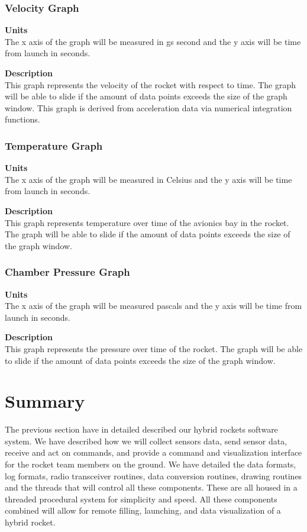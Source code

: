 \documentclass[10pt,draftclsnofoot,onecolumn,compsoc]{IEEEtran}
\begin{document}
\subsubsection{Velocity Graph}
{\bf Units} \\ The x axis of the graph will be measured in gs second and the y axis will be time from launch in seconds.\par
{\bf Description} \\ This graph represents the velocity of the rocket with respect to time. The graph will be able to slide if the amount of data points exceeds the size of the graph window. This graph is derived from acceleration data via numerical integration functions. \par

\subsubsection{Temperature Graph}
{\bf Units} \\ The x axis of the graph will be measured in Celsius and the y axis will be time from launch in seconds.\par
{\bf Description} \\ This graph represents temperature over time of the avionics bay in the rocket. The graph will be able to slide if the amount of data points exceeds the size of the graph window. \par

\subsubsection{Chamber Pressure Graph}
{\bf Units} \\ The x axis of the graph will be measured pascals and the y axis will be time from launch in seconds.\par
{\bf Description} \\ This graph represents the pressure over time of the rocket. The graph will be able to slide if the amount of data points exceeds the size of the graph window. \par


\section{Summary}
The previous section have in detailed described our hybrid rockets software system. We have described how we will collect sensors data, send sensor data, receive and act on commands, and provide  a command and visualization interface for the rocket team members on the ground. We have detailed the data formats, log formats, radio transceiver routines, data conversion routines, drawing routines and the threads that will control all these components. These are all housed in a threaded procedural system for simplicity and speed. All these components combined will allow for remote filling, launching, and data visualization of a hybrid rocket. \par
\end{document}
